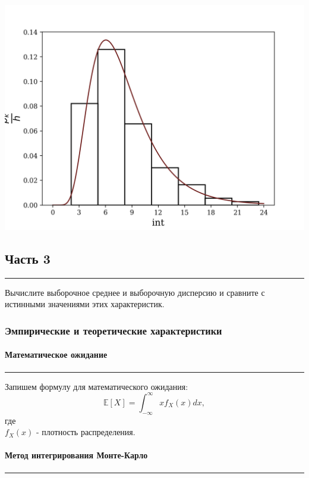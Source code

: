 \documentclass[a4paper, 14pt]{extarticle}
\begin{document}
\includegraphics[width=1\textwidth]{histXpdf}

\subsection{Часть 3}\vspace{-20pt}\rule{\linewidth}{0.1mm}

Вычислите выборочное среднее и выборочную дисперсию и сравните с 
истинными значениями этих характеристик.

\subsubsection{Эмпирические и теоретические характеристики}

\paragraph{Математическое ожидание}\vspace{-20pt}\rule{\linewidth}{0.1mm}

Запишем формулу для математического ожидания:
\begin{equation}
  \mathbb{E}[X] = \int_{-\infty}^{\infty} x f_X (x) dx, 
\end{equation}
где\\
$f_X (x)$ - плотность распределения.\\ 

\paragraph{Метод интегрирования Монте-Карло}\vspace{-20pt}\rule{\linewidth}{0.1mm}
\end{document}
